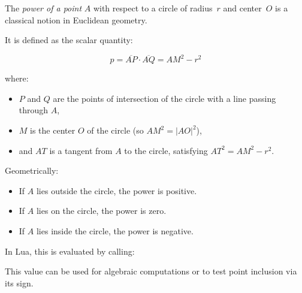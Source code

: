 The \emph{power of a point} $A$ with respect to a circle of radius~$r$ and center~$O$ is a classical notion in Euclidean geometry.

\medskip

It is defined as the scalar quantity:

\[
p = \overline{AP} \cdot \overline{AQ} = AM^2 - r^2
\]

where:
\begin{itemize}
  \item $P$ and $Q$ are the points of intersection of the circle with a line passing through $A$,
  \item $M$ is the center $O$ of the circle (so $AM^2 = |AO|^2$),
  \item and $AT$ is a tangent from $A$ to the circle, satisfying $AT^2 = AM^2 - r^2$.
\end{itemize}


Geometrically:
\begin{itemize}
  \item If $A$ lies outside the circle, the power is positive.
  \item If $A$ lies on the circle, the power is zero.
  \item If $A$ lies inside the circle, the power is negative.
\end{itemize}

\medskip

In Lua, this is evaluated by calling:

\begin{center}
\end{center}


This value can be used for algebraic computations or to test point inclusion via its sign.

\vspace{1em}

